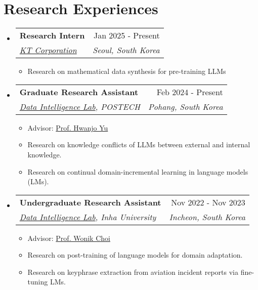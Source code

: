 \documentclass[letterpaper,11pt]{article}
\makeatletter
\newcommand{\resumeSubheading}[4]{
  \vspace{-1pt}\item
    \begin{tabular*}{0.97\textwidth}{l@{\extracolsep{\fill}}r}
      #1 & #2 \\
      \textit{\small#3} & \textit{\small #4} \\
    \end{tabular*}\vspace{-5pt}
}
\makeatother
\begin{document}
    \section{Research Experiences}
    \begin{itemize}[leftmargin=*,label=]

        \resumeSubheading
        {\textbf{Research Intern}}{Jan 2025 - Present}
            {\href{https://corp.kt.com/eng/}{KT Corporation}}{Seoul, South Korea}
            \begin{itemize}[label=\bullet]
                \item Research on mathematical data synthesis for pre-training LLMs
            \end{itemize}
            

        \resumeSubheading
        {\textbf{Graduate Research Assistant} }{Feb 2024 - Present}
            {\href{https://sites.google.com/view/postechdi/home}{Data Intelligence Lab}, POSTECH}{Pohang, South Korea}
            \begin{itemize}[label=\bullet]
                \item Advisor: \href{https://sites.google.com/view/postechdi/member/faculty}{Prof. Hwanjo Yu}
                \item Research on knowledge conflicts of LLMs between external and internal knowledge.
                \item Research on continual domain-incremental learning in language models (LMs).
            \end{itemize}
            
            
        \resumeSubheading
        {\textbf{Undergraduate Research Assistant} }{Nov 2022 - Nov 2023}
            {\href{http://dilab.inha.ac.kr/}{Data Intelligence Lab}, Inha University}{Incheon, South Korea}
            \begin{itemize}[label=\bullet]
                \item{Advisor: \href{http://bit.ly/3zSrQ8F}{Prof. Wonik Choi}}
                \item{Research on post-training of language models for domain adaptation.}
                \item{Research on keyphrase extraction from aviation incident reports via fine-tuning LMs.}
            \end{itemize}
            

\end{itemize}
\end{document}
